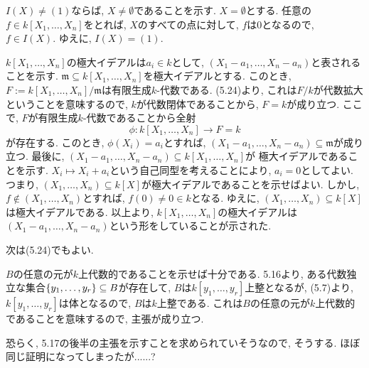 \documentclass[dvipdfmx]{jsarticle}
\begin{document}
    \begin{problem}
        $I(X) \neq (1)$ならば, $X \neq \emptyset$であることを示す.
        $X = \emptyset$とする.
        任意の$f \in k[X_1, \dots, X_n]$をとれば,
        $X$のすべての点に対して, $f$は$0$となるので, $f \in I(X)$.
        ゆえに, $I(X) = (1)$.

        $k[X_1, \dots, X_n]$の極大イデアルは$a_i \in k$として,
        $(X_1 -a_1, \dots, X_n - a_n)$と表されることを示す.
        $\mathfrak{m} \subseteq k[X_1, \dots, X_n]$を極大イデアルとする.
        このとき, $F := k[X_1, \dots, X_n]/\mathfrak{m}$は有限生成$k$-代数である.
        (5.24)より, これは$F/k$が代数拡大ということを意味するので, $k$が代数閉体であることから,
        $F = k$が成り立つ.
        ここで, $F$が有限生成$k$-代数であることから全射
        \[
            \phi: k[X_1, \dots, X_n] \longrightarrow F = k
        \]
        が存在する.
        このとき,
        $\phi(X_i) = a_i$とすれば, $(X_1-a_1, \dots, X_n - a_n) \subseteq \mathfrak{m}$が成り立つ.
        最後に, $(X_1 - a_1, \dots,X_n - a_n) \subseteq k[X_1, \dots, X_n]$が
        極大イデアルであることを示す.
        $X_i \mapsto X_i + a_i$という自己同型を考えることにより, $a_i = 0$としてよい.
        つまり, $(X_1, \dots, X_n) \subseteq k[X]$が極大イデアルであることを示せばよい.
        しかし, $f \notin (X_1, \dots, X_n)$とすれば, $f(0) \neq 0 \in k$となる.
        ゆえに, $(X_1, \dots, X_n) \subseteq k[X]$は極大イデアルである.
        以上より, $k[X_1, \dots, X_n]$の極大イデアルは$(X_1 -a_1, \dots, X_n-a_n)$という形をしていることが示された.
    \end{problem}

    次は(5.24)でもよい.

    \begin{problem}
        $B$の任意の元が$k$上代数的であることを示せば十分である.
        5.16より, ある代数独立な集合$\{y_1, \dots, y_r\} \subseteq B$が存在して,
        $B$は$k[y_1, \dots, y_r]$上整となるが,
        (5.7)より, $k[y_1, \dots, y_r]$は体となるので,  $B$は$k$上整である.
        これは$B$の任意の元が$k$上代数的であることを意味するので, 主張が成り立つ.
    \end{problem}

    \color{red}
        恐らく, 5.17の後半の主張を示すことを求められていそうなので, そうする.
        ほぼ同じ証明になってしまったが......?
    \color{black}
\end{document}
